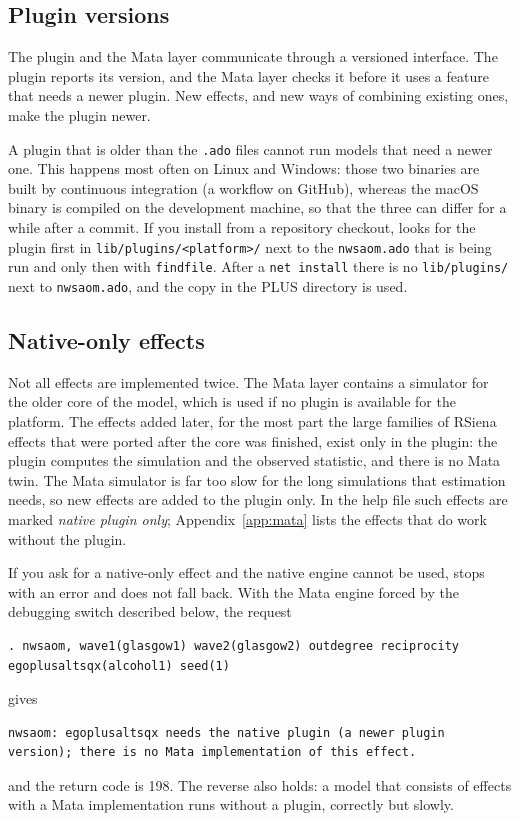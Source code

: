 \subsection{Plugin versions}

The plugin and the Mata layer communicate through a versioned interface. The plugin reports its version, and the Mata layer checks it before it uses a feature that needs a newer plugin. New effects, and new ways of combining existing ones, make the plugin newer.

A plugin that is older than the \texttt{.ado} files cannot run models that need a newer one. This happens most often on Linux and Windows: those two binaries are built by continuous integration (a workflow on GitHub), whereas the macOS binary is compiled on the development machine, so that the three can differ for a while after a commit. If you install from a repository checkout, \nwsaom{} looks for the plugin first in \texttt{lib/plugins/<platform>/} next to the \texttt{nwsaom.ado} that is being run and only then with \texttt{findfile}. After a \texttt{net install} there is no \texttt{lib/plugins/} next to \texttt{nwsaom.ado}, and the copy in the PLUS directory is used.

\subsection{Native-only effects}

Not all effects are implemented twice. The Mata layer contains a simulator for the older core of the model, which is used if no plugin is available for the platform. The effects added later, for the most part the large families of RSiena effects that were ported after the core was finished, exist only in the plugin: the plugin computes the simulation and the observed statistic, and there is no Mata twin. The Mata simulator is far too slow for the long simulations that estimation needs, so new effects are added to the plugin only. In the help file such effects are marked \emph{native plugin only}; Appendix~\ref{app:mata} lists the effects that do work without the plugin.

If you ask for a native-only effect and the native engine cannot be used, \nwsaom{} stops with an error and does not fall back. With the Mata engine forced by the debugging switch described below, the request
\begin{lstlisting}
. nwsaom, wave1(glasgow1) wave2(glasgow2) outdegree reciprocity egoplusaltsqx(alcohol1) seed(1)
\end{lstlisting}
gives
\begin{lstlisting}
nwsaom: egoplusaltsqx needs the native plugin (a newer plugin version); there is no Mata implementation of this effect.
\end{lstlisting}
and the return code is 198. The reverse also holds: a model that consists of effects with a Mata implementation runs without a plugin, correctly but slowly.

